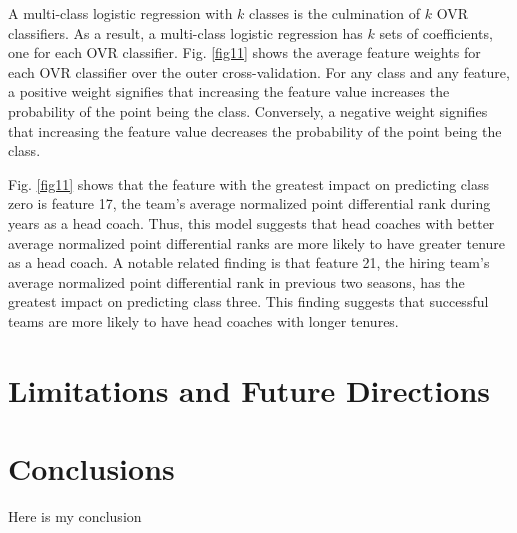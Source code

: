 \documentclass[conference]{IEEEtran}
\begin{document}
A multi-class logistic regression with $k$ classes is the culmination of $k$ OVR classifiers. As a result, a multi-class logistic regression has $k$ sets of coefficients, one for each OVR classifier. Fig. \ref{fig11} shows the average feature weights for each OVR classifier over the outer cross-validation. For any class and any feature, a positive weight signifies that increasing the feature value increases the probability of the point being the class. Conversely, a negative weight signifies that increasing the feature value decreases the probability of the point being the class. 

Fig. \ref{fig11} shows that the feature with the greatest impact on predicting class zero is feature 17, the team's average normalized point differential rank during years as a head coach. Thus, this model suggests that head coaches with better average normalized point differential ranks are more likely to have greater tenure as a head coach. A notable related finding is that feature 21, the hiring team's average normalized point differential rank in previous two seasons, has the greatest impact on predicting class three. This finding suggests that successful teams are more likely to have head coaches with longer tenures. 

\section{Limitations and Future Directions}

\section{Conclusions}
Here is my conclusion
\end{document}
